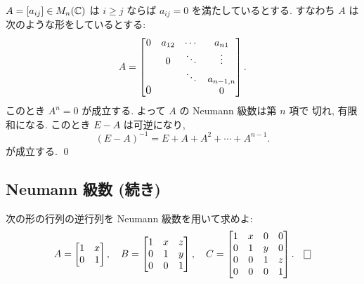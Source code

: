 \documentclass[12pt,twoside]{jarticle}
\begin{document}
\begin{question}
  \label{q:nilpotent-matrix}
  $A=[a_{ij}]\in M_n({\mathbb C})$ は $i\ge j$ ならば $a_{ij}=0$ を満たしているとする.
  すなわち $A$ は次のような形をしているとする:
  \begin{equation*}
    A = 
    \begin{bmatrix}
      0 & a_{12} & \cdots & a_{n1} \\
        & 0      & \ddots & \vdots \\
        &        & \ddots & a_{n-1,n} \\
      \smash{\hbox{\large 0}}  & &      & 0 \\
    \end{bmatrix}.
  \end{equation*}
  このとき $A^n=0$ が成立する.  よって $A$ の Neumann 級数は第 $n$ 項で
  切れ, 有限和になる. このとき $E-A$ は可逆になり, 
  \begin{equation*}
    (E-A)^{-1} = E + A + A^2 + \cdots + A^{n-1}.
  \end{equation*}
  が成立する. \qed
\end{question}


\subsection{Neumann 級数 (続き)}

\begin{question}
  \label{q:inv-unip-mat-1}
  次の形の行列の逆行列を Neumann 級数を用いて求めよ:
  \begin{equation*}
    A =
    \begin{bmatrix}
      1 & x \\
      0 & 1 \\
    \end{bmatrix},
    \quad
    B = 
    \begin{bmatrix}
      1 & x & z \\
      0 & 1 & y \\
      0 & 0 & 1 \\
    \end{bmatrix},
    \quad
    C = 
    \begin{bmatrix}
      1 & x & 0 & 0 \\
      0 & 1 & y & 0 \\
      0 & 0 & 1 & z \\
      0 & 0 & 0 & 1 \\
    \end{bmatrix}.
    \qed
  \end{equation*}
\end{question}
\end{document}
